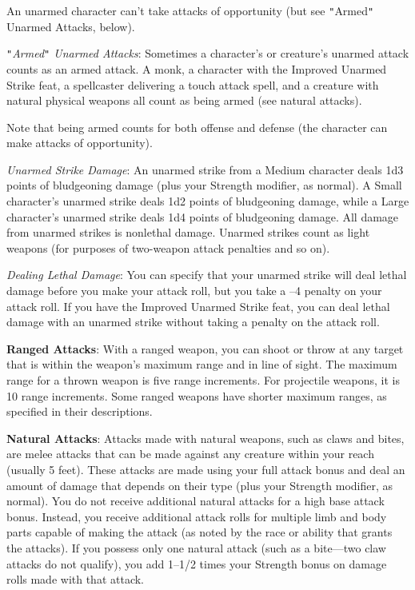 An unarmed character can't take attacks of opportunity (but see \texttt{{}"{}}Armed\texttt{{}"{}} Unarmed Attacks, below).
				
\textit{\texttt{{}"{}}Armed\texttt{{}"{}} Unarmed Attacks}: Sometimes a character's or creature's unarmed attack counts as an armed attack. A monk, a character with the Improved Unarmed Strike feat, a spellcaster delivering a touch attack spell, and a creature with natural physical weapons all count as being armed (see natural attacks).
				
Note that being armed counts for both offense and defense (the character can make attacks of opportunity).
				
\textit{Unarmed Strike Damage}: An unarmed strike from a Medium character deals 1d3 points of bludgeoning damage (plus your Strength modifier, as normal). A Small character's unarmed strike deals 1d2 points of bludgeoning damage, while a Large character's unarmed strike deals 1d4 points of bludgeoning damage. All damage from unarmed strikes is nonlethal damage. Unarmed strikes count as light weapons (for purposes of two-weapon attack penalties and so on).
				
\textit{Dealing Lethal Damage}: You can specify that your unarmed strike will deal lethal damage before you make your attack roll, but you take a --4 penalty on your attack roll. If you have the Improved Unarmed Strike feat, you can deal lethal damage with an unarmed strike without taking a penalty on the attack roll.
				
\textbf{Ranged Attacks}: With a ranged weapon, you can shoot or throw at any target that is within the weapon's maximum range and in line of sight. The maximum range for a thrown weapon is five range increments. For projectile weapons, it is 10 range increments. Some ranged weapons have shorter maximum ranges, as specified in their descriptions.
				
\textbf{Natural Attacks}: Attacks made with natural weapons, such as claws and bites, are melee attacks that can be made against any creature within your reach (usually 5 feet). These attacks are made using your full attack bonus and deal an amount of damage that depends on their type (plus your Strength modifier, as normal). You do not receive additional natural attacks for a high base attack bonus. Instead, you receive additional attack rolls for multiple limb and body parts capable of making the attack (as noted by the race or ability that grants the attacks). If you possess only one natural attack (such as a bite---two claw attacks do not qualify), you add 1--1/2 times your Strength bonus on damage rolls made with that attack.
				
